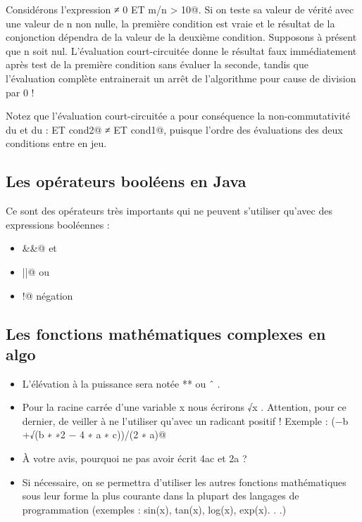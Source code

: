 \documentclass[11pt,a4paper]{article}
\begin{document}
          Consid\'erons l'expression \verb@n ≠ 0 ET m/n > 10@. Si on teste sa valeur
          de v\'erit\'e avec une valeur de n non nulle, la premi\`ere condition est vraie et le r\'esultat de
          la conjonction d\'ependra de la valeur de la deuxi\`eme condition. Supposons \`a pr\'esent que n
          soit nul. L'\'evaluation court-circuit\'ee donne le r\'esultat faux imm\'ediatement apr\`es test de la
          premi\`ere condition sans \'evaluer la seconde, tandis que l'\'evaluation compl\`ete entrainerait un
          arr\^et de l'algorithme pour cause de division par 0 !
          
            \par
        
          Notez que l'\'evaluation court-circuit\'ee a pour cons\'equence la non-commutativit\'e du 
          \verb@ET@ et du \verb@OU@ : 
           ET cond2@ ≠  ET cond1@, 
          puisque l'ordre des \'evaluations des deux conditions entre en jeu.
          
            \par
        \subsection{Les op\'erateurs bool\'eens en Java}
          Ce sont des op\'erateurs tr\`es importants qui ne peuvent s'utiliser qu'avec des expressions bool\'eennes :
          
					\begin{itemize}
				
			\item \verb@&&@ et 
			\item \verb@||@ ou 
			\item \verb@!@ n\'egation 
					\end{itemize}
				
            \par
        \subsection{Les fonctions math\'ematiques complexes en algo}
					\begin{itemize}
				
			\item L'\'el\'evation \`a la puissance sera not\'ee ** ou ˆ . 
			\item Pour la racine carr\'ee d'une variable x nous \'ecrirons √x . Attention, pour ce dernier, de veiller \`a ne l'utiliser qu'avec un radicant positif !
            Exemple : \verb@(−b +√(b ∗ ∗2 − 4 ∗ a ∗ c))/(2 ∗ a)@
			\item  \`A votre avis, pourquoi ne pas avoir \'ecrit \guillemotleft  4ac \guillemotright  et \guillemotleft  2a \guillemotright  ?
			\item Si n\'ecessaire, on se permettra d'utiliser les autres fonctions math\'ematiques sous leur forme
            la plus courante dans la plupart des langages de programmation (exemples : sin(x), tan(x), log(x), exp(x). . .)
					\end{itemize}
				
\end{document}
